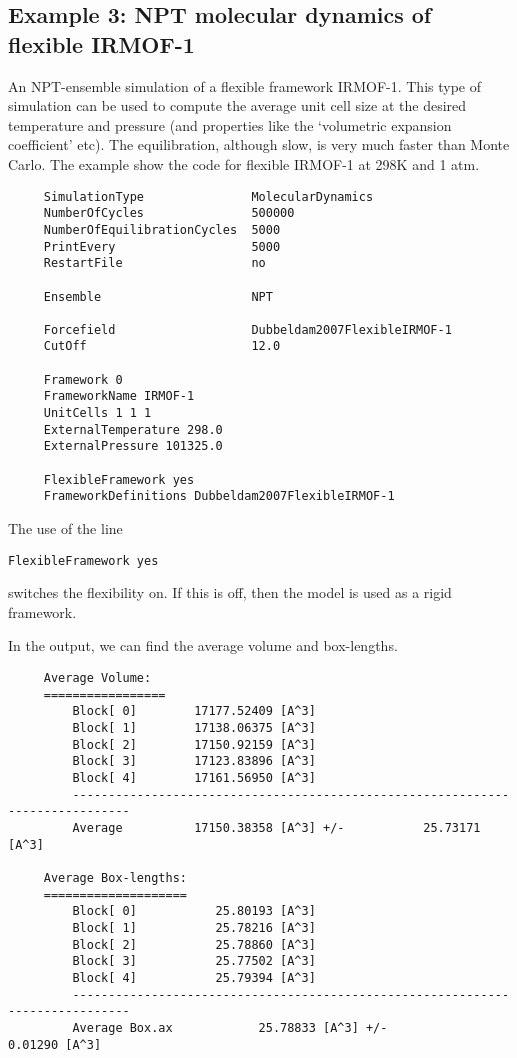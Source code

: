 \subsection*{Example 3: NPT molecular dynamics of flexible IRMOF-1}

An NPT-ensemble simulation of a flexible framework IRMOF-1. This type of simulation can be used to compute the average
unit cell size at the desired temperature and pressure (and properties like the `volumetric expansion coefficient' etc).
The equilibration, although slow, is very much faster than Monte Carlo. The example show the code for flexible
IRMOF-1 at 298K and 1 atm.

\begin{tiny}
\begin{verbatim}
     SimulationType               MolecularDynamics
     NumberOfCycles               500000
     NumberOfEquilibrationCycles  5000
     PrintEvery                   5000
     RestartFile                  no

     Ensemble                     NPT

     Forcefield                   Dubbeldam2007FlexibleIRMOF-1
     CutOff                       12.0

     Framework 0
     FrameworkName IRMOF-1
     UnitCells 1 1 1
     ExternalTemperature 298.0
     ExternalPressure 101325.0

     FlexibleFramework yes
     FrameworkDefinitions Dubbeldam2007FlexibleIRMOF-1
\end{verbatim}
\end{tiny}

\noindent
The use of the line
\begin{tiny}
\begin{verbatim}
FlexibleFramework yes
\end{verbatim}
\end{tiny}
switches the flexibility on. If this is off, then the model is used as a rigid framework.

\noindent
In the output, we can find the average volume and box-lengths.
\begin{tiny}
\begin{verbatim}
     Average Volume:
     =================
         Block[ 0]        17177.52409 [A^3]
         Block[ 1]        17138.06375 [A^3]
         Block[ 2]        17150.92159 [A^3]
         Block[ 3]        17123.83896 [A^3]
         Block[ 4]        17161.56950 [A^3]
         ------------------------------------------------------------------------------
         Average          17150.38358 [A^3] +/-           25.73171 [A^3]

     Average Box-lengths:
     ====================
         Block[ 0]           25.80193 [A^3]
         Block[ 1]           25.78216 [A^3]
         Block[ 2]           25.78860 [A^3]
         Block[ 3]           25.77502 [A^3]
         Block[ 4]           25.79394 [A^3]
         ------------------------------------------------------------------------------
         Average Box.ax            25.78833 [A^3] +/-            0.01290 [A^3]
\end{verbatim}
\end{tiny}


